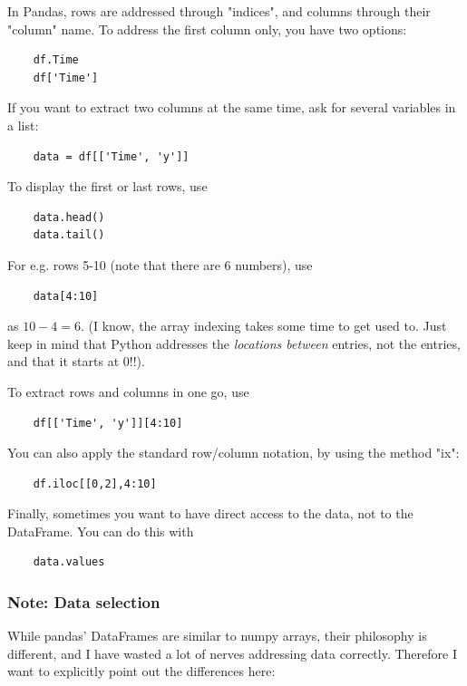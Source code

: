 In Pandas, rows are addressed through "indices", and columns through their "column" name.
To address the first column only, you have two options:

\begin{lstlisting}
    df.Time
    df['Time']
\end{lstlisting}

If you want to extract two columns at the same time, ask for several variables in a list:

\begin{lstlisting}
    data = df[['Time', 'y']]
\end{lstlisting}

To display the first or last rows, use

\begin{lstlisting}
    data.head()
    data.tail()
\end{lstlisting}

For e.g. rows 5-10 (note that there are 6 numbers), use

\begin{lstlisting}
    data[4:10]
\end{lstlisting}

as $10-4=6$. (I know, the array indexing takes some time to get used to. Just keep in mind that Python addresses the \emph{locations between} entries, not the entries, and that it starts at $0$!!).

To extract rows and columns in one go, use

\begin{lstlisting}
    df[['Time', 'y']][4:10]
\end{lstlisting}

You can also apply the standard row/column notation, by using the method "ix":

\begin{lstlisting}
    df.iloc[[0,2],4:10]
\end{lstlisting}

Finally, sometimes you want to have direct access to the data, not to the DataFrame. You can do this with

\begin{lstlisting}
    data.values
\end{lstlisting}

\subsubsection{Note: Data selection}

While pandas' DataFrames are similar to numpy arrays, their philosophy is different, and I have wasted a lot of nerves addressing data correctly. Therefore I want to explicitly point out the differences here:


